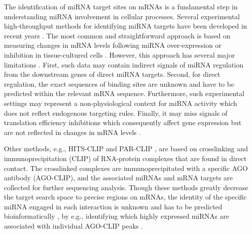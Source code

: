 \documentclass{bmcart}
\begin{document}
The identification of miRNA target sites on mRNAs is a fundamental step in understanding miRNA involvement in cellular processes. Several experimental high-throughput methods for identifying miRNA targets have been developed in recent years \cite{li2019current, martinez2013microrna}.
The most common and straightforward approach is based on measuring changes in mRNA levels following miRNA over-expression or inhibition in tissue-cultured cells \cite{thomas2010desperately}. However, this approach has several major limitations \cite{li2019current, martinez2013microrna}. First, such data may contain indirect signals of miRNA regulation from the downstream genes of direct miRNA targets. Second, for direct regulation, the exact sequences of binding sites are unknown and have to be predicted within the relevant mRNA sequence. Furthermore, such experimental settings may represent a non-physiological context for miRNA activity which does not reflect endogenous targeting rules. Finally, it may miss signals of translation efficiency inhibitions which consequently affect gene expression but are not reflected in changes in mRNA levels \cite{fabian2010regulation}.


Other methods, e.g., HITS-CLIP \cite{chi2009argonaute, zisoulis2010comprehensive} and PAR-CLIP \cite{hafner2010transcriptome}, are based on crosslinking and immunoprecipitation (CLIP) of RNA-protein complexes that are found in direct contact. The crosslinked complexes are immunoprecipitated with a specific AGO antibody (AGO-CLIP), and the associated miRNAs and mRNA targets are collected for further sequencing analysis. Though these methods greatly decrease the target search space to precise regions on mRNAs, the identity of the specific miRNA engaged in each interaction is unknown and has to be predicted bioinformatically \cite{wang2015design, uhl2017computational}, by e.g., identifying which highly expressed miRNAs are associated with individual AGO-CLIP peaks \cite{majoros2013microrna, reczko2012functional, liu2013clip, khorshid2013biophysical}.
\end{document}
